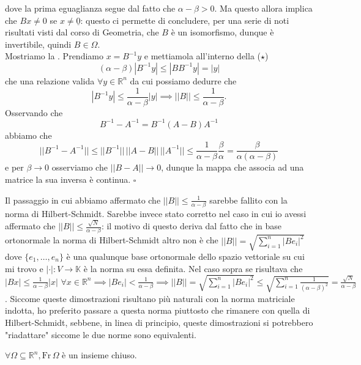 dove la prima eguaglianza segue dal fatto che $\alpha - \beta > 0$. Ma questo allora implica che $Bx \neq 0$ se $x \neq \underline{0}$: questo ci permette di concludere, per una serie di noti risultati visti dal corso di Geometria, che $B$ è un isomorfismo, dunque è invertibile, quindi $B \in \mathit{\Omega}$. \\
Mostriamo la . Prendiamo $x = B^{-1}y$ e mettiamola all'interno della ($\star$)
\[
(\alpha - \beta) |B^{-1}y| \leq |BB^{-1}y| = |y|
\]
che una relazione valida $\forall y \in \mathbb{R}^n$ da cui possiamo dedurre che
\[
    |B^{-1}y| \leq \frac{1}{\alpha - \beta} |y| \implies || B || \leq \frac{1}{\alpha - \beta}.
\]
Osservando che
\[
    B^{-1} - A^{-1} = B^{-1} (A-B) A^{-1}
\]
abbiamo che
\[
|| B^{-1} - A^{-1} || \leq || B^{-1} || \, || A - B || \, || A^{-1} || \leq \frac{1}{\alpha - \beta} \frac{\beta}{\alpha} = \frac{\beta}{\alpha (\alpha - \beta)}
\]
e per $\beta \to 0$ osserviamo che $|| B - A || \to 0$, dunque la mappa che associa ad una matrice la sua inversa è continua.
\hfill $\square$
%
\begin{remark}
    Il passaggio in cui abbiamo affermato che $|| B || \leq \frac{1}{\alpha - \beta}$ sarebbe fallito con la norma di Hilbert-Schmidt. Sarebbe invece stato corretto nel caso in cui io avessi affermato che $|| B || \leq \frac{\sqrt{N}}{\alpha - \beta}$: il motivo
    di questo deriva dal fatto che in base ortonormale la norma di Hilbert-Schmidt altro non è che $|| B || = \sqrt{\sum\limits_{i=1}^n |Be_i|^2}$ dove $\{e_1, \ldots, e_n \}$ è una qualunque base ortonormale dello spazio vettoriale su cui mi trovo e $|\cdot|:V \to \mathbb{K}$ è la norma su essa definita. Nel caso sopra se risultava che
    $|Bx| \leq \frac{1}{\alpha - \beta} |x| \, \, \forall x \in \mathbb{R}^n \implies |Be_i| < \frac{1}{\alpha - \beta} \implies || B || = \sqrt{\sum\limits_{i=1}^n |Be_i|^2} \leq \sqrt{\sum\limits_{i=1}^n \frac{1}{(\alpha - \beta)^2}} = \frac{\sqrt{N}}{\alpha - \beta}$. Siccome queste dimostrazioni risultano più naturali con la norma matriciale indotta, ho preferito
    passare a questa norma piuttosto che rimanere con quella di Hilbert-Schmidt, sebbene, in linea di principio, queste dimostrazioni si potrebbero "riadattare" siccome le due norme sono equivalenti.
\end{remark}
%
\vspace{0.5cm}
\begin{lemma}
    $\forall \Omega \subseteq \mathbb{R}^n, \text{Fr} \, \Omega$ è un insieme chiuso.
    \label{lemma:frontiera_chiusa}
\end{lemma}
